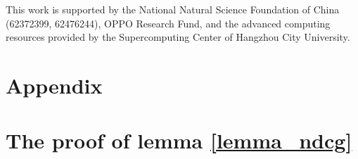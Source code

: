 \documentclass[sigconf,natbib=true]{acmart}
\begin{document}
\begin{acks}
 This work is supported by the National Natural Science Foundation of China (62372399, 62476244), OPPO Research Fund, and the advanced computing resources provided by the Supercomputing Center of Hangzhou City University.
\end{acks}


\appendix
\section*{Appendix}

\section{The proof of lemma \ref{lemma_ndcg}}
\label{apd:lemma_ndcg}
\end{document}
